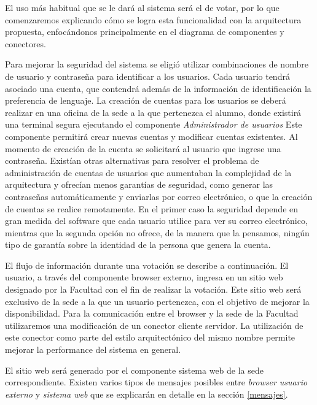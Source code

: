 El uso más habitual que se le dará al sistema será el de votar, por lo que comenzaremos explicando cómo se logra esta funcionalidad con la arquitectura propuesta, enfocándonos principalmente en el diagrama de componentes y conectores.


Para mejorar la seguridad del sistema se eligió utilizar combinaciones de nombre de usuario y contraseña para identificar a los usuarios. Cada usuario tendrá asociado una cuenta, que contendrá además de la información de identificación la preferencia de lenguaje. La creación de cuentas para los usuarios se deberá realizar en una oficina de la sede a la que pertenezca el alumno, donde existirá una terminal segura ejecutando el componente \emph{Administrador de usuarios} Este componente permitirá crear nuevas cuentas y modificar cuentas existentes. Al momento de creación de la cuenta se solicitará al usuario que ingrese una contraseña. Existían otras alternativas para resolver el problema de administración de cuentas de usuarios que aumentaban la complejidad de la arquitectura y ofrecían menos garantías de seguridad, como generar las contraseñas automáticamente y enviarlas por correo electrónico, o que la creación de cuentas se realice remotamente. En el primer caso la seguridad depende en gran medida del software que cada usuario utilice para ver su correo electrónico, mientras que la segunda opción no ofrece, de la manera que la pensamos, ningún tipo de garantía sobre la identidad de la persona que genera la cuenta.

El flujo de información durante una votación se describe a continuación. El usuario, a través del componente browser externo, ingresa en un sitio web designado por la Facultad con el fin de realizar la votación.  Este sitio web será exclusivo de la sede a la que un usuario pertenezca, con el objetivo de mejorar la disponibilidad. Para la comunicación entre el browser y la sede de la Facultad utilizaremos una modificación de un conector cliente servidor. La utilización de este conector como parte del estilo arquitectónico del mismo nombre permite mejorar la performance del sistema en general.

El sitio web será generado por el componente sistema web de la sede correspondiente. Existen varios tipos de mensajes posibles entre \emph{browser usuario externo} y \emph{sistema web} que se explicarán en detalle en la sección \ref{mensajes}. 

